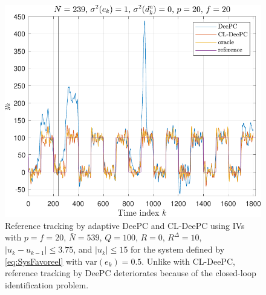 \begin{figure}
\begin{center}
\includegraphics[width=\columnwidth]{results/figures/DeePC_CL_ID_issue_Re_1.mat_Nbar_239_p_20_f_20_Ru_1_Rdu_0_Q_100_R_0_dR_10.pdf}    %
\caption{Reference tracking by adaptive \ac{DeePC} and \ac{CL-DeePC} using \ac{IVs} with $p=f=20$, $\bar{N}=539$, $Q=100$, $R=0$, $R^\Delta=10$, $|u_k-u_{k-1}|\leq3.75$, and $|u_k|\leq15$ for the system defined by \eqref{eq:SysFavoreel} with $\text{var}(e_k)=0.5$. %
Unlike with \ac{CL-DeePC}, reference tracking by \ac{DeePC} deteriorates because of the closed-loop identification problem.}  %
\label{fig:CL_Problem_Solution}                                 %
\end{center}                                 %
\end{figure}
